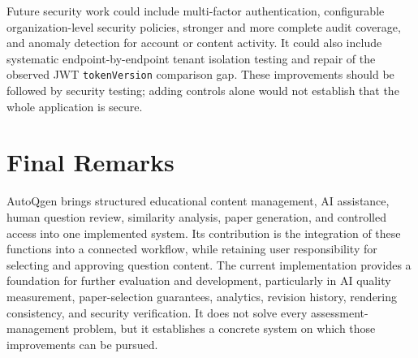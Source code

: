 Future security work could include multi-factor authentication, configurable organization-level security policies, stronger and more complete audit coverage, and anomaly detection for account or content activity. It could also include systematic endpoint-by-endpoint tenant isolation testing and repair of the observed JWT \texttt{tokenVersion} comparison gap. These improvements should be followed by security testing; adding controls alone would not establish that the whole application is secure.

\section{Final Remarks}

AutoQgen brings structured educational content management, AI assistance, human question review, similarity analysis, paper generation, and controlled access into one implemented system. Its contribution is the integration of these functions into a connected workflow, while retaining user responsibility for selecting and approving question content. The current implementation provides a foundation for further evaluation and development, particularly in AI quality measurement, paper-selection guarantees, analytics, revision history, rendering consistency, and security verification. It does not solve every assessment-management problem, but it establishes a concrete system on which those improvements can be pursued.
